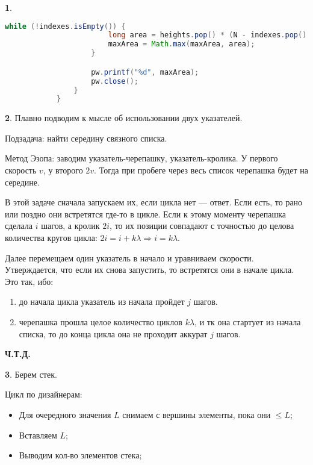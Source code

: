 \documentclass[14pt, a4paper]{extarticle}
\theoremstyle{definition}
\newtheorem{problem}{}
\theoremstyle{definition}
\theoremstyle{remark}
\numberwithin{equation}{section}
\begin{document}
\begin{problem}
\begin{footnotesize}
\begin{lstlisting}[language=Java]
                    while (!indexes.isEmpty()) {
                        long area = heights.pop() * (N - indexes.pop() + 1);
                        maxArea = Math.max(maxArea, area);
                    }

                    pw.printf("%d", maxArea);
                    pw.close();
                }
            }
        \end{lstlisting}
    \end{footnotesize}
\end{problem}

\begin{problem}
    Плавно подводим к мысле об использовании двух указателей.

    Подзадача: найти середину связного списка.

    Метод Эзопа: заводим указатель-черепашку, указатель-кролика.
    У первого скорость $v$, у второго $2v$. Тогда при пробеге через
    весь список черепашка будет на середине.

    В этой задаче сначала запускаем их, если цикла нет --- ответ.
    Если есть, то рано или поздно они встретятся где-то в цикле.
    Если к этому моменту черепашка сделала $i$ шагов, а кролик $2i$,
    то их позиции совпадают с точностью до целова количества кругов
    цикла: $2i = i + k \lambda \Rightarrow i = k \lambda$.

    Далее перемещаем один указатель в начало и уравниваем скорости.
    Утверждается, что если их снова запустить, то встретятся они
    в начале цикла. Это так, ибо:
    \begin{enumerate}
        \item до начала цикла указатель из начала пройдет $j$ шагов. 
        \item черепашка прошла целое количество
        циклов $k \lambda$, и тк она стартует из начала списка, то до конца
        цикла она не проходит аккурат $j$ шагов.
    \end{enumerate}
    \textbf{Ч.Т.Д.}
\end{problem}

\begin{problem}
    Берем стек. 

    Цикл по дизайнерам:
    \begin{itemize}[]
        \item Для очередного значения $L$ снимаем с вершины элементы, пока они $\leqslant L$;
        \item Вставляем $L$;
        \item Выводим кол-во элементов стека;
    \end{itemize}
\end{problem}
\end{document}
